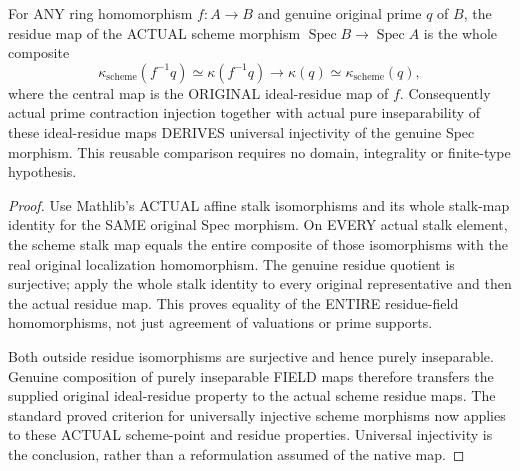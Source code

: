 \begin{theorem}
\label{scheme:actual-spec-residue-conjugation-radicial}
For ANY ring homomorphism $f:A\to B$ and genuine original prime $q$
of $B$, the residue map of the ACTUAL scheme morphism
$\operatorname{Spec}B\to\operatorname{Spec}A$ is the whole composite
\[
 \kappa_{\mathrm{scheme}}(f^{-1}q)
 \simeq \kappa(f^{-1}q)\longrightarrow\kappa(q)
 \simeq \kappa_{\mathrm{scheme}}(q),
\]
where the central map is the ORIGINAL ideal-residue map of $f$.
Consequently actual prime contraction injection together with actual
pure inseparability of these ideal-residue maps DERIVES universal
injectivity of the genuine Spec morphism. This reusable comparison
requires no domain, integrality or finite-type hypothesis.
\leanok
\end{theorem}
\begin{proof}
Use Mathlib's ACTUAL affine stalk isomorphisms and its whole stalk-map
identity for the SAME original Spec morphism. On EVERY actual stalk
element, the scheme stalk map equals the entire composite of those
isomorphisms with the real original localization homomorphism.
The genuine residue quotient is surjective; apply the whole stalk
identity to every original representative and then the actual residue
map. This proves equality of the ENTIRE residue-field homomorphisms,
not just agreement of valuations or prime supports.

Both outside residue isomorphisms are surjective and hence purely
inseparable. Genuine composition of purely inseparable FIELD maps
therefore transfers the supplied original ideal-residue property to
the actual scheme residue maps. The standard proved criterion for
universally injective scheme morphisms now applies to these ACTUAL
scheme-point and residue properties. Universal injectivity is the
conclusion, rather than a reformulation assumed of the native map.
\end{proof}

